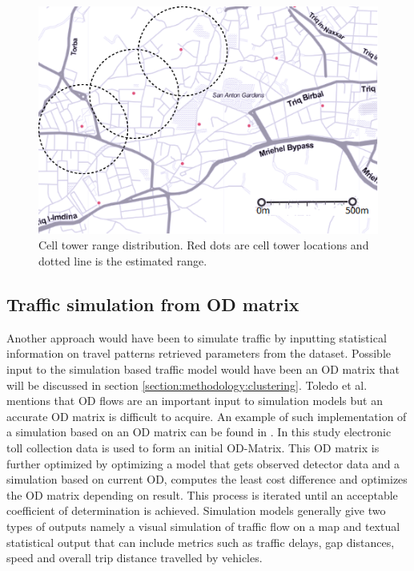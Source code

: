 \documentclass[12pt, a4paper]{report}
\theoremstyle{definition}
\theoremstyle{definition}%
\theoremstyle{definition}%
\theoremstyle{definition}%
\theoremstyle{definition}%
\theoremstyle{definition}%
\begin{document}
\begin{figure}[h]	
	\includegraphics[scale=0.75]{cell_towers_distribution}
	\centering
	\caption{Cell tower range distribution. Red dots are cell tower locations and dotted line is the estimated range.}
	\label{fig:cell_towers_distribution}
\end{figure}

\subsection{Traffic simulation from OD matrix} \label{subsection:methodology:traffic_simulation_ODMatrix}
Another approach would have been to simulate traffic by inputting statistical information on travel patterns retrieved parameters from the dataset. Possible input to the simulation based traffic model would have been an OD matrix that will be discussed in section \ref{section:methodology:clustering}. Toledo et al. \cite{Toledo2004} mentions that OD flows are an important input to simulation models but an accurate OD matrix is difficult to acquire. An example of such implementation of a simulation based on an OD matrix can be found in \cite{Hirai2015}. In this study electronic toll collection data is used to form an initial OD-Matrix. This OD matrix is further optimized by optimizing a model that gets observed detector data and a simulation based on current OD, computes the least cost difference and optimizes the OD matrix depending on result. This process is iterated until an acceptable coefficient of determination is achieved. Simulation models generally give two types of outputs namely a visual simulation of traffic flow on a map and textual statistical output that can include metrics such as traffic delays, gap distances, speed and overall trip distance travelled by vehicles.
\end{document}
